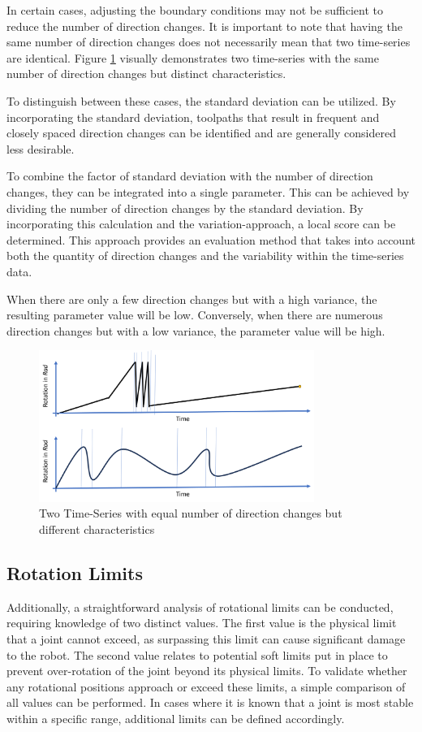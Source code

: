 \newpage
In certain cases, adjusting the boundary conditions may not be sufficient to reduce the number of direction changes. It is important to note that having the same number of direction changes does not necessarily mean that two time-series are identical. Figure \ref{dirchangeSTD} visually demonstrates two time-series with the same number of direction changes but distinct characteristics.

To distinguish between these cases, the standard deviation can be utilized. By incorporating the standard deviation, toolpaths that result in frequent and closely spaced direction changes can be identified and are generally considered less desirable.

To combine the factor of standard deviation with the number of direction changes, they can be integrated into a single parameter. This can be achieved by dividing the number of direction changes by the standard deviation. By incorporating this calculation and the variation-approach, a local score can be determined. This approach provides an evaluation method that takes into account both the quantity of direction changes and the variability within the time-series data.

When there are only a few direction changes but with a high variance, the resulting parameter value will be low. Conversely, when there are numerous direction changes but with a low variance, the parameter value will be high.


\begin{figure}[H]
	\centerline{\includegraphics[width=0.8\textwidth]{figures/DirSTD.png}}
	\caption{Two Time-Series with equal number of direction changes but different characteristics}
	\label{dirchangeSTD}
\end{figure}

\subsection{Rotation Limits}\label{RotLim}
Additionally, a straightforward analysis of rotational limits can be conducted, requiring knowledge of two distinct values. The first value is the physical limit that a joint cannot exceed, as surpassing this limit can cause significant damage to the robot. The second value relates to potential soft limits put in place to prevent over-rotation of the joint beyond its physical limits. To validate whether any rotational positions approach or exceed these limits, a simple comparison of all values can be performed. In cases where it is known that a joint is most stable within a specific range, additional limits can be defined accordingly.

